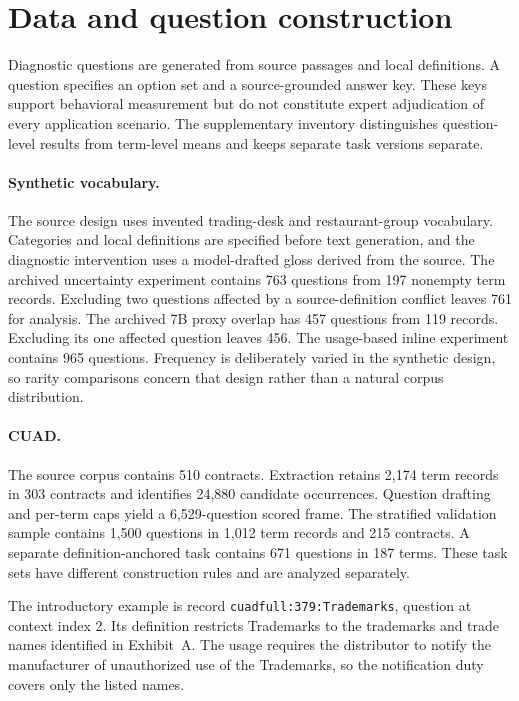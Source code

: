 \section{Data and question construction}
\label{app:sources}
Diagnostic questions are generated from source passages and local definitions. A question specifies an option set and a source-grounded answer key. These keys support behavioral measurement but do not constitute expert adjudication of every application scenario. The supplementary inventory distinguishes question-level results from term-level means and keeps separate task versions separate.

\paragraph{Synthetic vocabulary.}
The source design uses invented trading-desk and restaurant-group vocabulary. Categories and local definitions are specified before text generation, and the diagnostic intervention uses a model-drafted gloss derived from the source. The archived uncertainty experiment contains 763 questions from 197 nonempty term records. Excluding two questions affected by a source-definition conflict leaves 761 for analysis. The archived 7B proxy overlap has 457 questions from 119 records. Excluding its one affected question leaves 456. The usage-based inline experiment contains 965 questions. Frequency is deliberately varied in the synthetic design, so rarity comparisons concern that design rather than a natural corpus distribution.

\paragraph{CUAD.}
The source corpus contains 510 contracts. Extraction retains 2,174 term records in 303 contracts and identifies 24,880 candidate occurrences. Question drafting and per-term caps yield a 6,529-question scored frame. The stratified validation sample contains 1,500 questions in 1,012 term records and 215 contracts. A separate definition-anchored task contains 671 questions in 187 terms. These task sets have different construction rules and are analyzed separately.

The introductory example is record \texttt{cuadfull:379:Trademarks}, question at context index 2. Its definition restricts Trademarks to the trademarks and trade names identified in Exhibit~A. The usage requires the distributor to notify the manufacturer of unauthorized use of the Trademarks, so the notification duty covers only the listed names.

